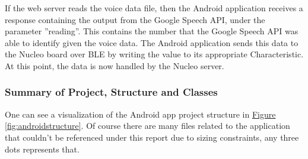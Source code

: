 If the web server reads the voice data file, then the Android application receives a response containing the output from the Google Speech API, under the parameter ''reading''. This contains the number that the Google Speech API was able to identify given the voice data. The Android application sends this data to the Nucleo board over BLE by writing the value to its appropriate Characteristic. At this point, the data is now handled by the Nucleo server.

\subsubsection{Summary of Project, Structure and Classes}

One can see a visualization of the Android app project structure in
\hyperref[fig:androidstructure]{Figure \ref{fig:androidstructure}}. Of course there are many files related to the application that couldn't be referenced under this report due to sizing constraints, any three dots represents that.\\


